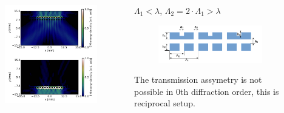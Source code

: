 \documentclass{beamer}
\begin{document}
\begin{frame}
	\begin{columns}
		\begin{column}{0.5\textwidth}
			\begin{figure}[htb]
				\includegraphics[width=\textwidth]{../images/dmg/letters_eneden.png}
			\end{figure}
		\end{column}
		\begin{column}{0.5\textwidth}
			$\Lambda_1 < \lambda$, $\Lambda_2 = 2 \cdot \Lambda_1 > \lambda$
			\begin{figure}[htb]
				\includegraphics[width=\textwidth]{../images/dmg/letters_schemat.png}
			\end{figure}
			The transmission assymetry is not possible in 0th diffraction order, this is reciprocal setup.
			
		\end{column}
	\end{columns}
	{\tiny \cite{Stolarek:13}}
		
\end{frame}
\end{document}
